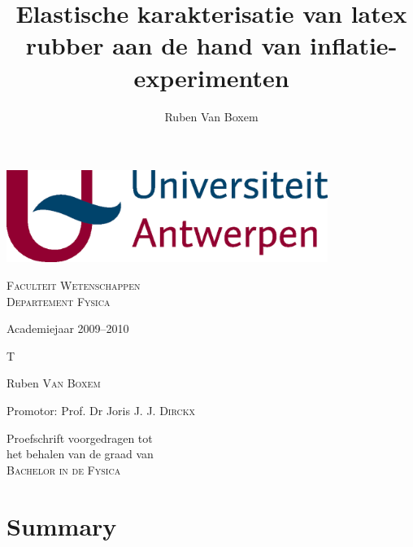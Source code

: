 \documentclass[a4paper,11pt]{article}
\title{Elastische karakterisatie van latex rubber aan de hand van inflatie-experimenten}
\author{Ruben Van Boxem}
\numberwithin{equation}{section} %
\begin{document}
\fontsize{12pt}{14pt}\selectfont

\begin{center}


\includegraphics[height=3cm]{Afbeeldingen/UA.eps}

\vspace{1cm}

\fontsize{14pt}{17pt}\selectfont
\textsc{Faculteit Wetenschappen} \\
\textsc{Departement Fysica}
\fontsize{12pt}{14pt}\selectfont
\vspace{0.3cm}

\vspace{1.2cm}

Academiejaar 2009--2010

\vspace{2.8cm}

\fontsize{17.28pt}{21pt}\selectfont

\textsc{T}

\fontsize{12pt}{14pt}\selectfont

\vspace{3cm}

Ruben \textsc{Van Boxem}	


\vspace{2cm}

Promotor: Prof. Dr Joris J. J. \textsc{Dirckx}\\
\vspace{2cm}
\end{center}
Proefschrift voorgedragen tot \\
het behalen van de graad van\\
\textsc{Bachelor in de Fysica}


\thispagestyle{empty}
\newpage

\section*{Summary}
\end{document}
